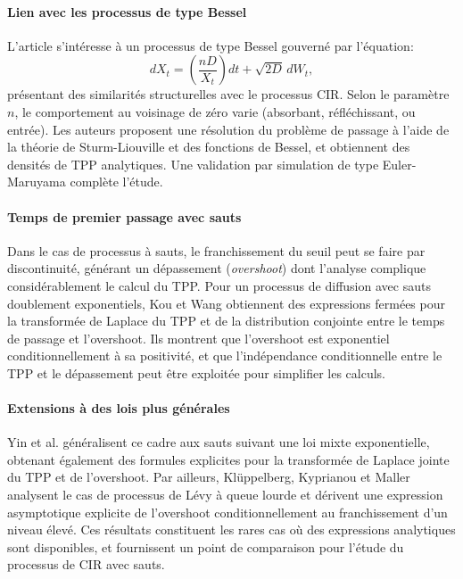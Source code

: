 \paragraph{Lien avec les processus de type Bessel}

L'article\cite{martin2011} s'intéresse à un processus de type Bessel gouverné par l'équation:
\[
dX_t = \left(\frac{nD}{X_t}\right) dt + \sqrt{2D}\, dW_t,
\]
présentant des similarités structurelles avec le processus \acs{CIR}. Selon le paramètre \( n \), le comportement au voisinage de zéro varie (absorbant, réfléchissant, ou entrée). Les auteurs proposent une résolution du problème de passage à l'aide de la théorie de Sturm-Liouville et des fonctions de Bessel, et obtiennent des densités de \acs{TPP} analytiques. Une validation par simulation de type Euler-Maruyama complète l'étude.

\paragraph{Temps de premier passage avec sauts}

Dans le cas de processus à sauts, le franchissement du seuil peut se faire par discontinuité, générant un dépassement (\textit{overshoot}) dont l'analyse complique considérablement le calcul du \acs{TPP}. Pour un processus de diffusion avec sauts doublement exponentiels, Kou et Wang\cite{kou2003} obtiennent des expressions fermées pour la transformée de Laplace du \acs{TPP} et de la distribution conjointe entre le temps de passage et l'overshoot. Ils montrent que l'overshoot est exponentiel conditionnellement à sa positivité, et que l'indépendance conditionnelle entre le \acs{TPP} et le dépassement peut être exploitée pour simplifier les calculs.

\paragraph{Extensions à des lois plus générales}

Yin et al.\cite{yin2014} généralisent ce cadre aux sauts suivant une loi mixte exponentielle, obtenant également des formules explicites pour la transformée de Laplace jointe du \acs{TPP} et de l'overshoot. Par ailleurs, Klüppelberg, Kyprianou et Maller\cite{kluppelberg2004} analysent le cas de processus de Lévy à queue lourde et dérivent une expression asymptotique explicite de l'overshoot conditionnellement au franchissement d'un niveau élevé. Ces résultats constituent les rares cas où des expressions analytiques sont disponibles, et fournissent un point de comparaison pour l'étude du processus de \acs{CIR} avec sauts.
